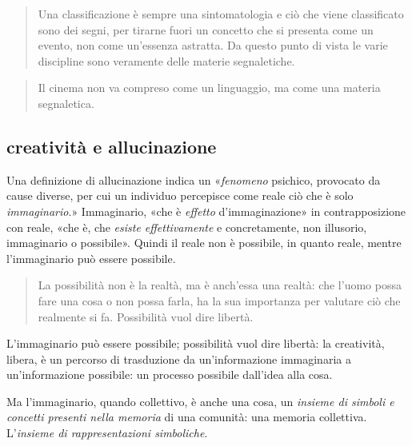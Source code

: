 \begin{quote}
\begin{sf}
\small
  Una classificazione è sempre una sintomatologia e ciò che viene classificato
  sono dei segni, per tirarne fuori un concetto che si presenta come un evento,
  non come un'essenza astratta. Da questo punto di vista le varie discipline
  sono veramente delle materie segnaletiche.
  \cite{deleuze2009}
  \end{sf}
\end{quote}

\begin{quote}
\begin{sf}
\small
  Il cinema non va compreso come un linguaggio, ma come una materia segnaletica.
  \cite{deleuze2009}
  \end{sf}
\end{quote}


\subsection{creatività e allucinazione}

Una definizione di allucinazione indica un «\emph{fenomeno} psichico,
provocato da cause diverse, per cui un individuo percepisce come reale ciò che
è solo \emph{immaginario}.» Immaginario, «che è \emph{effetto} d'immaginazione»
in contrapposizione con reale, «che è, che \emph{esiste effettivamente} e
concretamente, non illusorio, immaginario o possibile». Quindi il reale non è
possibile, in quanto reale, mentre l'immaginario può essere possibile.

\begin{quote}
  La possibilità non è la realtà, ma è anch'essa una realtà: che l'uomo possa
  fare una cosa o non possa farla, ha la sua importanza per valutare ciò che
  realmente si fa. Possibilità vuol dire libertà. \cite{ag:matst}
\end{quote}%

L'immaginario può essere possibile; possibilità vuol dire libertà: la creatività,
libera, è un percorso di trasduzione da un'informazione immaginaria a
un'informazione possibile: un processo possibile dall'idea alla cosa.

Ma l'immaginario, quando collettivo, è anche una cosa, un \emph{insieme di
simboli e concetti presenti nella memoria} di una comunità: una memoria
collettiva. L'\emph{insieme di rappresentazioni simboliche}.

